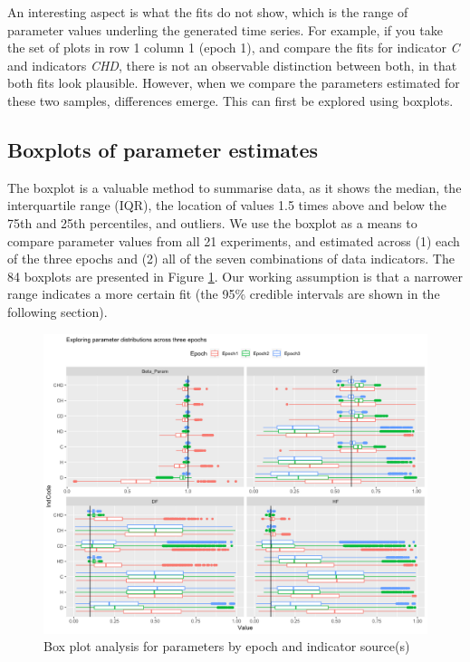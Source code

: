 \documentclass[10pt,letterpaper]{article}
\begin{document}
An interesting aspect is what the fits do not show, which is the range of parameter values underling the generated time series. For example, if you take the set of plots in row 1 column 1 (epoch 1), and compare the fits for indicator \emph{C} and indicators \emph{CHD}, there is not an observable distinction between both, in that both fits look plausible. However, when we compare the parameters estimated for these two samples, differences emerge. This can first be explored using boxplots.

\hypertarget{boxplots-of-parameter-estimates}{%
\subsection{Boxplots of parameter estimates}\label{boxplots-of-parameter-estimates}}

The boxplot is a valuable method to summarise data, as it shows the median, the interquartile range (IQR), the location of values 1.5 times above and below the 75th and 25th percentiles, and outliers. We use the boxplot as a means to compare parameter values from all 21 experiments, and estimated across (1) each of the three epochs and (2) all of the seven combinations of data indicators. The 84 boxplots are presented in Figure \ref{fig:exp-boxplots}. Our working assumption is that a narrower range indicates a more certain fit (the 95\% credible intervals are shown in the following section).

\begin{figure}
\includegraphics[width=0.85\linewidth]{diagrams/exp_boxplots} \caption{Box plot analysis for parameters by epoch and indicator source(s)}\label{fig:exp-boxplots}
\end{figure}
\end{document}
